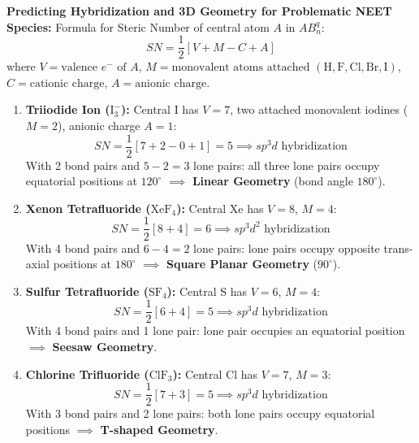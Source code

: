 \documentclass[10pt,twoside,openright]{book}
\begin{document}
\begin{usecasebox}
\textbf{Predicting Hybridization and 3D Geometry for Problematic NEET Species:}
Formula for Steric Number of central atom $A$ in $AB_n^{q}$:
\begin{equation*}
  SN = \frac{1}{2}\left[V + M - C + A\right]
\end{equation*}
where $V = \text{valence } e^- \text{ of } A$, $M = \text{monovalent atoms attached } (\mathrm{H, F, Cl, Br, I})$, $C = \text{cationic charge}$, $A = \text{anionic charge}$.
\begin{enumerate}
  \item \textbf{Triiodide Ion ($\mathrm{I_3^-}$):} Central $\mathrm{I}$ has $V = 7$, two attached monovalent iodines ($M = 2$), anionic charge $A = 1$:
  \begin{equation*}
    SN = \frac{1}{2}[7 + 2 - 0 + 1] = 5 \implies sp^3d \text{ hybridization}
  \end{equation*}
  With 2 bond pairs and $5 - 2 = 3$ lone pairs: all three lone pairs occupy equatorial positions at $120^\circ$ $\implies$ \textbf{Linear Geometry} (bond angle $180^\circ$).
  \item \textbf{Xenon Tetrafluoride ($\mathrm{XeF_4}$):} Central $\mathrm{Xe}$ has $V = 8$, $M = 4$:
  \begin{equation*}
    SN = \frac{1}{2}[8 + 4] = 6 \implies sp^3d^2 \text{ hybridization}
  \end{equation*}
  With 4 bond pairs and $6 - 4 = 2$ lone pairs: lone pairs occupy opposite trans-axial positions at $180^\circ$ $\implies$ \textbf{Square Planar Geometry} ($90^\circ$).
  \item \textbf{Sulfur Tetrafluoride ($\mathrm{SF_4}$):} Central $\mathrm{S}$ has $V = 6$, $M = 4$:
  \begin{equation*}
    SN = \frac{1}{2}[6 + 4] = 5 \implies sp^3d \text{ hybridization}
  \end{equation*}
  With 4 bond pairs and 1 lone pair: lone pair occupies an equatorial position $\implies$ \textbf{Seesaw Geometry}.
  \item \textbf{Chlorine Trifluoride ($\mathrm{ClF_3}$):} Central $\mathrm{Cl}$ has $V = 7$, $M = 3$:
  \begin{equation*}
    SN = \frac{1}{2}[7 + 3] = 5 \implies sp^3d \text{ hybridization}
  \end{equation*}
  With 3 bond pairs and 2 lone pairs: both lone pairs occupy equatorial positions $\implies$ \textbf{T-shaped Geometry}.
\end{enumerate}
\end{usecasebox}
\end{document}
